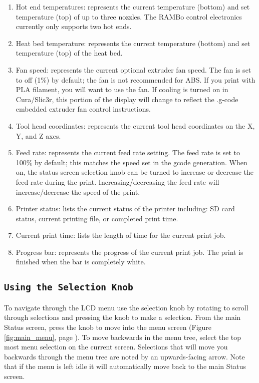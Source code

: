 \begin{enumerate}
\item Hot end temperatures: represents the current temperature (bottom) and set temperature (top) of up to three nozzles. The RAMBo control electronics currently only supports two hot ends.
\item Heat bed temperature: represents the current temperature (bottom) and set temperature (top) of the heat bed.
\item Fan speed: represents the current optional extruder fan speed. The fan is set to off (1\%) by default; the fan is not recommended for ABS. If you print with PLA filament, you will want to use the fan. If cooling is turned on in Cura/Slic3r, this portion of the display will change to reflect the .g-code embedded extruder fan control instructions.
\item Tool head coordinates: represents the current tool head coordinates on the X, Y, and Z axes.
\item Feed rate: represents the current feed rate setting. The feed rate is set to 100\% by default; this matches the speed set in the gcode generation. When on, the status screen selection knob can be turned to increase or decrease the feed rate during the print. Increasing/decreasing the feed rate will increase/decrease the speed of the print.
\item Printer status: lists the current status of the printer including: SD card status, current printing file, or completed print time.
\item Current print time: lists the length of time for the current print job.
\item Progress bar: represents the progress of the current print job. The print is finished when the bar is completely white.
\end{enumerate}


\subsection{\texttt{Using the Selection Knob}}
To navigate through the LCD menu use the selection knob by rotating to scroll through selections and pressing the knob to make a selection. From the main Status screen, press the knob to move into the menu screen (Figure \ref{fig:main_menu}, page \pageref{fig:main_menu}). To move backwards in the menu tree, select the top most menu selection on the current screen. Selections that will move you backwards through the menu tree are noted by an upwards-facing arrow. Note that if the menu is left idle it will automatically move back to the main Status screen.

